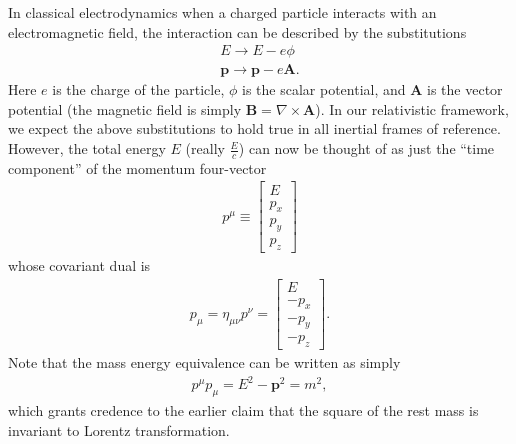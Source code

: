 \documentclass[titlepage,letterpaper,onecolumn,11pt,final]{report}
\numberwithin{equation}{section}
\numberwithin{figure}{section}
\begin{document}
In classical electrodynamics when a charged particle interacts with an electromagnetic field, the interaction can be described by the substitutions
\begin{subequations}
\begin{gather}
	\label{energy_interaction}
	E \rightarrow E - e \phi \\
	\label{momenutum_interaction}
	\mathbf{p} \rightarrow \mathbf{p} - e \mathbf{A}.
\end{gather}
\end{subequations}
%
Here $e$ is the charge of the particle, $\phi$ is the scalar potential, and $\mathbf{A}$ is the vector potential (the magnetic field is simply $\mathbf{B} = \nabla \times \mathbf{A}$).
In our relativistic framework, we expect the above substitutions to hold true in all inertial frames of reference. However, the total energy $E$ (really $\frac{E}{c}$) can now be thought of as just the ``time component'' of the momentum four-vector
\begin{gather}
	\label{momentum_contravariant}
	p^{\mu} \equiv 
	\begin{bmatrix}
		E \\[6pt]
		p_x \\[6pt]
		p_y \\[6pt]
		p_z
	\end{bmatrix}
\end{gather}
%
whose covariant dual is
\begin{gather}
	\label{momentum_covariant}
	p_{\mu} = \eta_{\mu \nu} p^{\nu} =
	\begin{bmatrix}
		E \\[6pt]
		-p_x \\[6pt]
		-p_y \\[6pt]
		-p_z
	\end{bmatrix}
	.
\end{gather}
%
Note that the mass energy equivalence can be written as simply
\begin{gather}
	\label{eq:em_equivalence_short}
	p^{\mu} p_{\mu} = E^{2} - \mathbf{p}^{2} = m^{2},
\end{gather}
which grants credence to the earlier claim that the square of the rest mass is invariant to Lorentz transformation.
\end{document}

